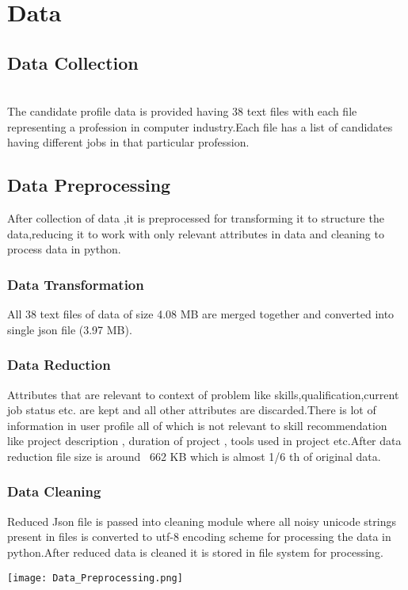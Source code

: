 \documentclass[journal]{IEEEtran}
\begin{document}
\section{\textbf{Data}}  
    \subsection{\textbf{Data Collection}}
    \\The candidate profile data is provided having 38 text files with each file representing a profession in computer industry.Each file has a list of candidates having different jobs in that particular profession.
    \subsection{\textbf{Data Preprocessing}}
    After collection of data ,it is preprocessed for transforming it to structure the data,reducing it to work with only relevant attributes in data and cleaning to process data in python.
    \subsubsection{\textbf{Data Transformation}}
        All 38 text files of data of size 4.08 MB are merged together and converted into single json file (3.97 MB).    
    \subsubsection{\textbf{Data Reduction}}
        Attributes that are relevant to context of problem like skills,qualification,current job status etc. are kept and all other attributes are discarded.There is lot of information in user profile all of which is not relevant to skill recommendation like project description , duration of project , tools used in project etc.After data reduction file size is around ~662 KB which is almost 1/6 th of original data.         
    \subsubsection{\textbf{Data Cleaning}}
        Reduced Json file is passed into cleaning module where all noisy unicode strings present in files is converted to utf-8 encoding scheme for processing the data in python.After reduced data is cleaned it is stored in file system for processing.
    
    \begin{center}
        \texttt{[image: Data\_Preprocessing.png]}
         \\\caption\textit{{Fig 1.Data Prepocessing module}}
    \end{center}
    
\end{document}

